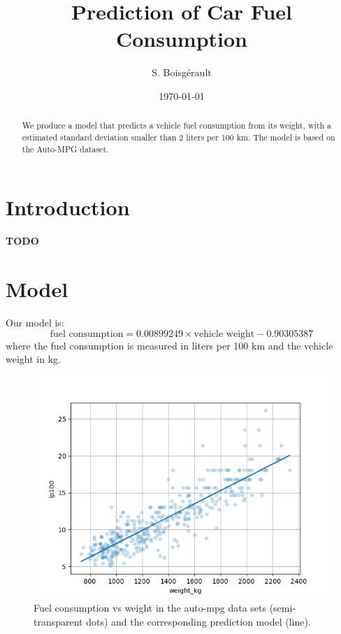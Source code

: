 \documentclass{article}
\title{Prediction of Car Fuel Consumption}
\author{S. Boisgérault}
\date{\today}
\begin{document}
\maketitle

\begin{abstract}
We produce a model that predicts a vehicle fuel consumption from its weight, 
with a estimated standard deviation smaller than 2 liters per 100 km. 
The model is based on the Auto-MPG dataset.
\end{abstract}

\section{Introduction}
\textbf{TODO}

\section{Model}

Our model is:
$$
\mbox{fuel consumption} =  0.00899249 \times \mbox{vehicle weight} -0.90305387
$$
where the fuel consumption is measured in liters per 100 km and the vehicle 
weight in kg.


\begin{figure}[htbp]
    \centering
    \includegraphics[width=\textwidth]{images/prediction.png} %
    \caption{Fuel consumption vs weight in the auto-mpg data sets (semi-transparent dots) 
     and the corresponding prediction model (line).}
    \label{fig:example}
\end{figure}
\end{document}
